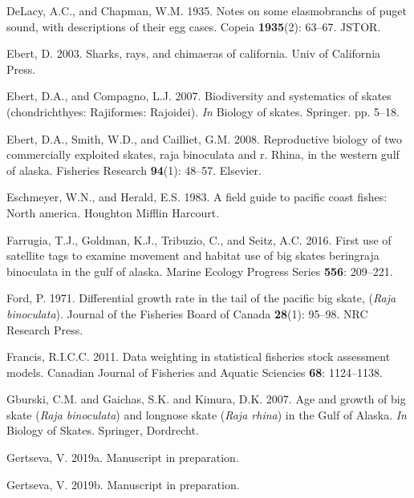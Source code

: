 \documentclass[12pt,]{article}
\begin{document}
\leavevmode\hypertarget{ref-DeLacy1935}{}%
DeLacy, A.C., and Chapman, W.M. 1935. Notes on some elasmobranchs of
puget sound, with descriptions of their egg cases. Copeia
\textbf{1935}(2): 63--67. JSTOR.

\leavevmode\hypertarget{ref-Ebert2003}{}%
Ebert, D. 2003. Sharks, rays, and chimaeras of california. Univ of
California Press.

\leavevmode\hypertarget{ref-Ebert2007}{}%
Ebert, D.A., and Compagno, L.J. 2007. Biodiversity and systematics of
skates (chondrichthyes: Rajiformes: Rajoidei). \emph{In} Biology of
skates. Springer. pp. 5--18.

\leavevmode\hypertarget{ref-Ebert2008}{}%
Ebert, D.A., Smith, W.D., and Cailliet, G.M. 2008. Reproductive biology
of two commercially exploited skates, raja binoculata and r. Rhina, in
the western gulf of alaska. Fisheries Research \textbf{94}(1): 48--57.
Elsevier.

\leavevmode\hypertarget{ref-Eschmeyer1983}{}%
Eschmeyer, W.N., and Herald, E.S. 1983. A field guide to pacific coast
fishes: North america. Houghton Mifflin Harcourt.

\leavevmode\hypertarget{ref-Farrugia2016}{}%
Farrugia, T.J., Goldman, K.J., Tribuzio, C., and Seitz, A.C. 2016. First
use of satellite tags to examine movement and habitat use of big skates
beringraja binoculata in the gulf of alaska. Marine Ecology Progress
Series \textbf{556}: 209--221.

\leavevmode\hypertarget{ref-Ford1971}{}%
Ford, P. 1971. Differential growth rate in the tail of the pacific big
skate, (\emph{Raja binoculata}). Journal of the Fisheries Board of
Canada \textbf{28}(1): 95--98. NRC Research Press.

\leavevmode\hypertarget{ref-Francis2011}{}%
Francis, R.I.C.C. 2011. Data weighting in statistical fisheries stock
assessment models. Canadian Journal of Fisheries and Aquatic Sciencies
\textbf{68}: 1124--1138.

\leavevmode\hypertarget{ref-Gburski2007}{}%
Gburski, C.M. and Gaichas, S.K. and Kimura, D.K. 2007. Age and growth of
big skate (\emph{Raja binoculata}) and longnose skate (\emph{Raja
rhina}) in the Gulf of Alaska. \emph{In} Biology of Skates. Springer,
Dordrecht.

\leavevmode\hypertarget{ref-Gertseva2019}{}%
Gertseva, V. 2019a. Manuscript in preparation.

\leavevmode\hypertarget{ref-Gertseva2011}{}%
Gertseva, V. 2019b. Manuscript in preparation.
\end{document}
